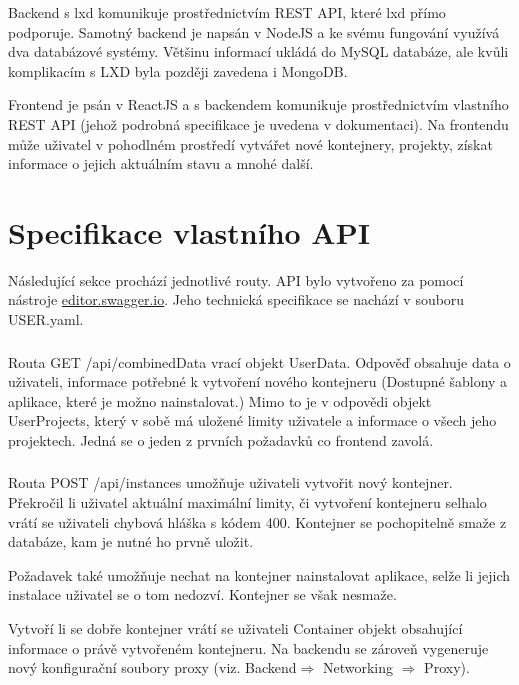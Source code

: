 \documentclass[a4paper,oneside,12pt]{report}
\begin{document}
Backend s lxd komunikuje prostřednictvím REST API, které lxd přímo podporuje.
Samotný backend je napsán v NodeJS a ke svému fungování využívá dva databázové systémy.
Většinu informací ukládá do MySQL databáze, ale kvůli komplikacím s LXD byla později zavedena i MongoDB.

Frontend je psán v ReactJS a s backendem komunikuje prostřednictvím vlastního REST API (jehož podrobná specifikace je uvedena v dokumentaci).
Na frontendu může uživatel v pohodlném prostředí vytvářet nové kontejnery, projekty, získat informace o jejich aktuálním stavu a mnohé další.


\section{Specifikace vlastního API}

Následující sekce prochází jednotlivé routy.
API bylo vytvořeno za pomocí nástroje \url{editor.swagger.io}.
Jeho technická specifikace se nachází v souboru USER.yaml.


\subsubsection{\color{apiblue}{GET -- /api/combinedData}}

Routa GET /api/combinedData vrací objekt UserData.
Odpověď obsahuje data o uživateli, informace potřebné k vytvoření nového kontejneru (Dostupné šablony a aplikace, které je možno nainstalovat.)
Mimo to je v odpovědi objekt UserProjects, který v sobě má uložené limity uživatele a informace o všech jeho projektech.
Jedná se o jeden z prvních požadavků co frontend zavolá.

\subsubsection{\color{apiblue}{POST -- /api/instances}}

Routa POST /api/instances umožňuje uživateli vytvořit nový kontejner.
Překročil li uživatel aktuální maximální limity, či vytvoření kontejneru selhalo vrátí se uživateli chybová hláška s kódem 400.
Kontejner se pochopitelně smaže z databáze, kam je nutné ho prvně uložit.

Požadavek také umožňuje nechat na kontejner nainstalovat aplikace, selže li jejich instalace uživatel se o tom nedozví.
Kontejner se však nesmaže.

Vytvoří li se dobře kontejner vrátí se uživateli Container objekt obsahující informace o právě vytvořeném kontejneru.
Na backendu se zároveň vygeneruje nový konfigurační soubory proxy (viz. Backend$\Rightarrow$ Networking $\Rightarrow$ Proxy).
\end{document}
